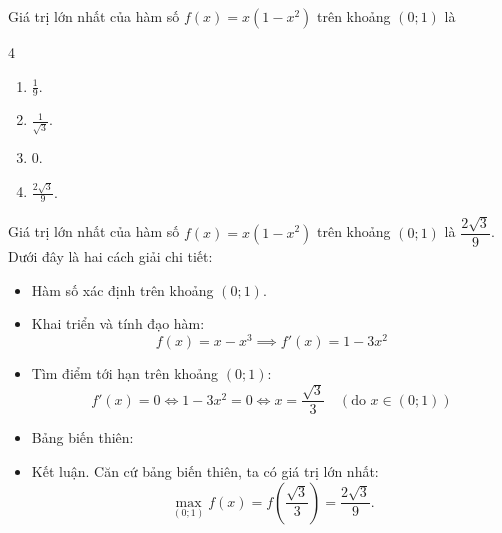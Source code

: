 \begin{baitap}
	Giá trị lớn nhất của hàm số $f(x) = x(1 - x^2)$ trên khoảng $(0; 1)$ là
	\begin{multicols}{4}
		\begin{enumerate}
			\item $\frac{1}{9}$.
			\item $\frac{1}{\sqrt{3}}$.
			\item $0$.
			\item $\frac{2\sqrt{3}}{9}$.
		\end{enumerate}
	\end{multicols}
	\begin{traloi}
		 Giá trị lớn nhất của hàm số $f(x) = x(1 - x^2)$ trên khoảng $(0; 1)$ là $\dfrac{2\sqrt{3}}{9}$. Dưới đây là hai cách giải chi tiết:
		\begin{itemize}
			\item Hàm số xác định trên khoảng $(0; 1)$.
			\item Khai triển và tính đạo hàm: $$f(x) = x - x^3 \implies f'(x) = 1 - 3x^2$$
			\item Tìm điểm tới hạn trên khoảng $(0; 1)$:$$f'(x) = 0 \iff 1 - 3x^2 = 0 \Leftrightarrow  x =\dfrac{\sqrt{3}}{3} \quad (\text{do } x \in (0; 1))$$
			\item Bảng biến thiên:
			\begin{center}
			\end{center}
			\item Kết luận. Căn cứ bảng biến thiên, ta có giá trị lớn nhất:$$\max\limits_{(0; 1)} f(x) = f\left(\dfrac{\sqrt{3}}{3}\right) = \dfrac{2\sqrt{3}}{9}.$$			
		\end{itemize}
	\end{traloi}
\end{baitap}

